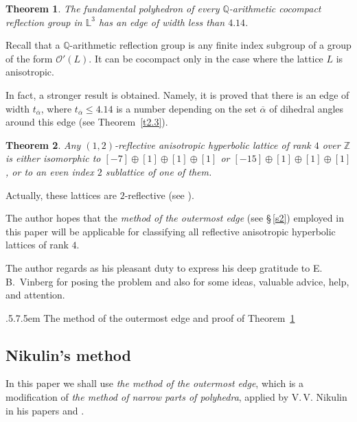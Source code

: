 \documentclass[reqno,12pt]{amsart}
\makeatletter
\def\section{\@startsection{section}{2}%
    {\z@}{.5\linespacing\@plus.7\linespacing}{.5em}%
    {\normalfont\bfseries\centering}}
\newcounter{z}
\newtheorem{theorem}{\indent Theorem}%
\makeatother
\begin{document}
\begin{theorem}
\label{t1.1}
The fundamental polyhedron of every $\mathbb{Q}$-arithmetic cocompact
 reflection group in $\mathbb{L}^3$ has an edge of width less than $4.14$.
\end{theorem}

Recall that a $\mathbb{Q}$-arithmetic reflection group is any finite index subgroup of a group
of the form $\mathcal{O}' (L)$. It can be cocompact only in the case where the lattice $L$ is anisotropic.

In fact, a stronger result is obtained. Namely, it is proved that
there is an edge of width
$ t_{\overline \alpha}$, where
$t_{\overline \alpha} \leq 4.14$ is a number depending on the set $\overline \alpha$ of
dihedral angles around this edge (see Theorem~\ref{t2.3}).


\begin{theorem}
\label{t1.2}
Any $(1{,}2)$-reflective anisotropic hyperbolic lattice of rank $4$ over $\mathbb{Z}$ is either isomorphic
to
$[-7] \oplus [1] \oplus [1] \oplus [1]$ or
$[-15] \oplus [1] \oplus [1] \oplus [1]$,
or to an even index $2$ sublattice of one of them.
\end{theorem}

Actually, these lattices are $2$-reflective (see \cite{Vin07}).

The author hopes that the \emph{method of the outermost edge} (see \S\,\ref{s2}) employed 
in this paper
will be applicable for classifying all reflective anisotropic hyperbolic lattices of rank $4$.

\medskip

The author regards  as his pleasant duty to express his deep gratitude to E.\,B.~Vinberg
for posing the problem and also for some
ideas, valuable advice, help, and attention.



\section{The method of the outermost edge and proof of Theorem~\ref{t1.1}}
\label{s2}

\subsection{Nikulin's method}
\label{ss2.1}
In this paper we shall use \textit{the method of the outermost edge},
which is a modification of \emph{the method of narrow parts of polyhedra}, applied by
V.\,V. Nikulin in his papers \cite{Nik80} and \cite{Nik00}.
\end{document}
